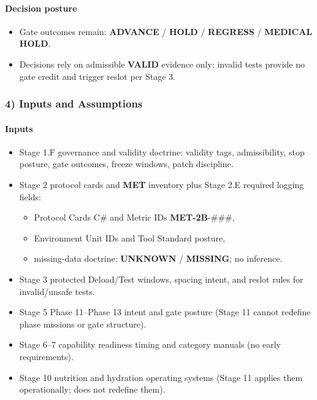 \documentclass[10pt]{article}
\begin{document}
\paragraph*{Decision posture}

\begin{itemize}
\item Gate outcomes remain: \textbf{ADVANCE} / \textbf{HOLD} / \textbf{REGRESS} / \textbf{MEDICAL} \textbf{HOLD}.
\item Decisions rely on admissible \textbf{VALID} evidence only; invalid tests provide no gate credit and trigger reslot per Stage 3.
\end{itemize}

\subsubsection*{4) Inputs and Assumptions}

\paragraph*{Inputs}

\begin{itemize}
\item Stage 1.F governance and validity doctrine: validity tags, admissibility, stop posture, gate outcomes, freeze windows, patch discipline.
\item Stage 2 protocol cards and \textbf{MET} inventory plus Stage 2.E required logging fields:
\begin{itemize}
\item Protocol Cards C# and Metric IDs \textbf{MET-2B}-###,
\item Environment Unit IDs and Tool Standard posture,
\item missing-data doctrine: \textbf{UNKNOWN} / \textbf{MISSING}; no inference.
\end{itemize}
\item Stage 3 protected Deload/Test windows, spacing intent, and reslot rules for invalid/unsafe tests.
\item Stage 5 Phase 11–Phase 13 intent and gate posture (Stage 11 cannot redefine phase missions or gate structure).
\item Stage 6–7 capability readiness timing and category manuals (no early requirements).
\item Stage 10 nutrition and hydration operating systems (Stage 11 applies them operationally; does not redefine them).
\end{itemize}
\end{document}

